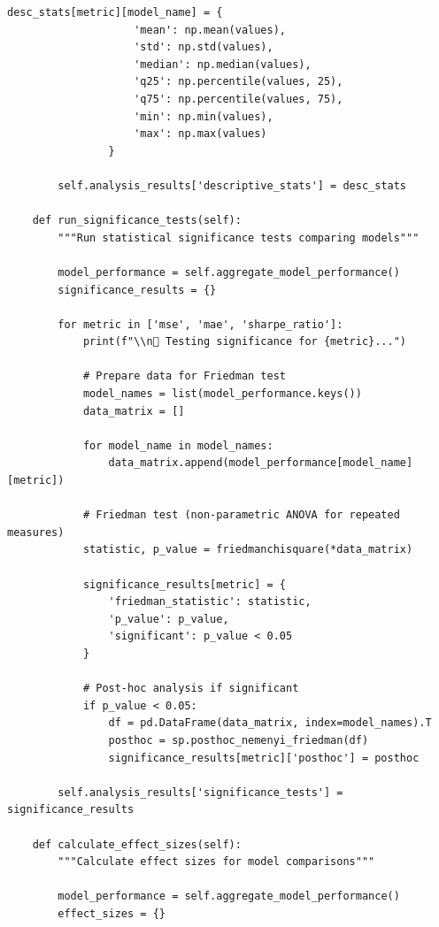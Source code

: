 \documentclass[11pt]{article}
\begin{document}
\begin{lstlisting}[style=pythonstyle, caption=Statistical Analysis Framework]
                desc_stats[metric][model_name] = {
                    'mean': np.mean(values),
                    'std': np.std(values),
                    'median': np.median(values),
                    'q25': np.percentile(values, 25),
                    'q75': np.percentile(values, 75),
                    'min': np.min(values),
                    'max': np.max(values)
                }
                
        self.analysis_results['descriptive_stats'] = desc_stats
        
    def run_significance_tests(self):
        """Run statistical significance tests comparing models"""
        
        model_performance = self.aggregate_model_performance()
        significance_results = {}
        
        for metric in ['mse', 'mae', 'sharpe_ratio']:
            print(f"\\n🧮 Testing significance for {metric}...")
            
            # Prepare data for Friedman test
            model_names = list(model_performance.keys())
            data_matrix = []
            
            for model_name in model_names:
                data_matrix.append(model_performance[model_name][metric])
                
            # Friedman test (non-parametric ANOVA for repeated measures)
            statistic, p_value = friedmanchisquare(*data_matrix)
            
            significance_results[metric] = {
                'friedman_statistic': statistic,
                'p_value': p_value,
                'significant': p_value < 0.05
            }
            
            # Post-hoc analysis if significant
            if p_value < 0.05:
                df = pd.DataFrame(data_matrix, index=model_names).T
                posthoc = sp.posthoc_nemenyi_friedman(df)
                significance_results[metric]['posthoc'] = posthoc
                
        self.analysis_results['significance_tests'] = significance_results
        
    def calculate_effect_sizes(self):
        """Calculate effect sizes for model comparisons"""
        
        model_performance = self.aggregate_model_performance()
        effect_sizes = {}
        

\end{lstlisting}
\end{document}

